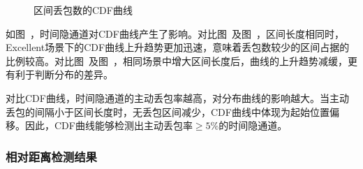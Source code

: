 {\begin{figure}[htbp]
{        }
        \caption{区间丢包数的CDF曲线}
        \label{fig:3:result:win:cdf}
	\end{figure}
}

如图\ ，时间隐通道对CDF曲线产生了影响。对比图\ 及图\ ，区间长度相同时，Excellent场景下的CDF曲线上升趋势更加迅速，意味着丢包数较少的区间占据的比例较高。对比图\ 及图\ ，相同场景中增大区间长度后，曲线的上升趋势减缓，更有利于判断分布的差异。

对比CDF曲线，时间隐通道的主动丢包率越高，对分布曲线的影响越大。当主动丢包的间隔小于区间长度时，无丢包区间减少，CDF曲线中体现为起始位置偏移。因此，CDF曲线能够检测出主动丢包率$\ge 5\%$的时间隐通道。

\subsubsection{相对距离检测结果}
\label{chap:analyze:result:window:distance}

